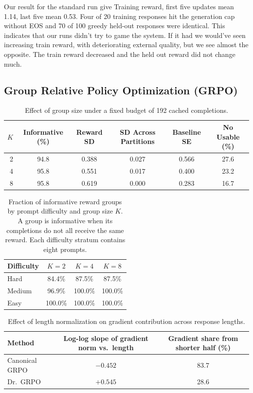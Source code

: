 \documentclass{article}
\begin{document}
Our result for the standard run give Training reward, first five updates mean 1.14, last five mean 0.53. Four of 20 training responses hit the generation cap without EOS and
70 of 100 greedy held-out responses were identical. This indicates that our runs didn't try to game the system. If it had we would've seen increasing train reward, with deteriorating
external quality, but we see almost the opposite. The train reward decreased and the held out reward did not change much.

\subsection{Group Relative Policy Optimization (GRPO)}

\begin{table}[t]
\centering
\small
\caption{Effect of group size under a fixed budget of 192 cached completions.}
\label{tab:grpo_group_size}
\begin{tabular}{rccccc}
\toprule
$K$ & Informative (\%) & Reward SD & SD Across Partitions
& Baseline SE & No Usable (\%) \\
\midrule
2 & 94.8 & 0.388 & 0.027 & 0.566 & 27.6 \\
4 & 95.8 & 0.551 & 0.017 & 0.400 & 23.2 \\
8 & 95.8 & 0.619 & 0.000 & 0.283 & 16.7 \\
\bottomrule
\end{tabular}
\end{table}

\begin{table}[t]
\centering
\small
\setlength{\tabcolsep}{6pt}
\caption{Fraction of informative reward groups by prompt difficulty
and group size $K$. A group is informative when its completions
do not all receive the same reward. Each difficulty stratum contains
eight prompts.}
\label{tab:grpo_difficulty}
\begin{tabular}{lccc}
\toprule
Difficulty & $K=2$ & $K=4$ & $K=8$ \\
\midrule
Hard   & 84.4\% & 87.5\% & 87.5\% \\
Medium & 96.9\% & 100.0\% & 100.0\% \\
Easy   & 100.0\% & 100.0\% & 100.0\% \\
\bottomrule
\end{tabular}
\end{table}

\begin{table}[t]
\centering
\small
\caption{Effect of length normalization on gradient contribution across response lengths.}
\label{tab:grpo_length_gradient}
\begin{tabular}{lcc}
\toprule
Method & Log-log slope of gradient norm vs.\ length
& Gradient share from shorter half (\%) \\
\midrule
Canonical GRPO & $-0.452$ & 83.7 \\
Dr.\ GRPO      & $+0.545$ & 28.6 \\
\bottomrule
\end{tabular}
\end{table}
\end{document}
